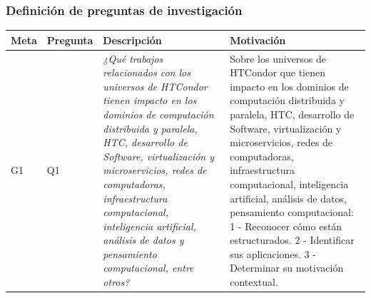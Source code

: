 \subsubsection{Definición de preguntas de investigación}\label{subsubsec:RQ-def}
\begin{table}[H]
	\centering
	\renewcommand{\arraystretch}{1.2} %
	\scriptsize %
	\begin{tabular}{|p{0.7cm}|p{1.3cm}|p{5.5cm}|p{6cm}|} %
		\hline
		\textbf{Meta}                                                                                                                                                                                                                                                                                                                                    & \textbf{Pregunta} & \textbf{Descripción} & \textbf{Motivación}       \\ \hline

		G1                                                                                                                                                                                                                                                                                                                                               & Q1                &
		\textit{¿Qué trabajos relacionados con los universos de HTCondor tienen impacto en los dominios de computación distribuida y paralela, HTC, desarrollo de Software, virtualización y microservicios, redes de computadoras, infraestructura computacional, inteligencia artificial, análisis de datos y pensamiento computacional, entre otros?} &
		Sobre los universos de HTCondor que tienen impacto en los dominios de computación distribuida y paralela, HTC, desarrollo de Software, virtualización y microservicios, redes de computadoras, infraestructura computacional, inteligencia artificial, análisis de datos, pensamiento computacional: 1 - Reconocer cómo están estructurados. 2 - Identificar sus aplicaciones. 3 - Determinar su motivación contextual. \\ \hline


\end{tabular}
\end{table}
